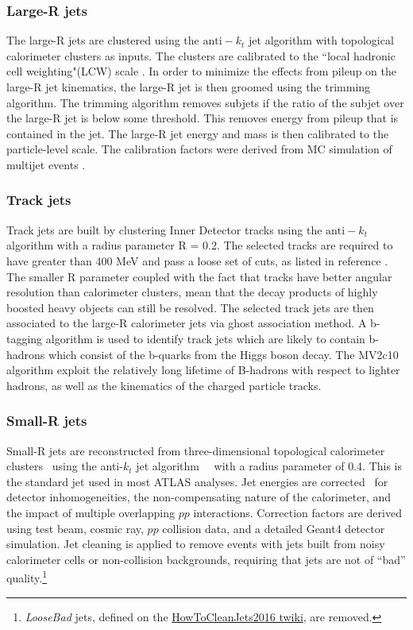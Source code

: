 \subsubsection{Large-R jets}
The large-R jets are clustered using the ${\mathrm{anti-}k_{t}}$ jet algorithm \cite{antikt_algorithm} with topological calorimeter clusters as inputs. The clusters are calibrated to the ``local hadronic cell weighting"(LCW) scale \cite{ATLAS-TopoClustering}.
In order to minimize the effects from pileup on the large-R jet kinematics, the large-R jet is then groomed
using the trimming algorithm. The trimming algorithm removes subjets if the ratio of the subjet \pt over the large-R jet \pt is below some threshold\cite{Krohn:2009th}. This removes energy from pileup that is contained in the jet. The large-R jet energy and mass is then calibrated to the particle-level
scale. The calibration factors were derived from MC simulation of multijet events \cite{ATLAS-CONF-2016-035}.\newline
\subsubsection{Track jets}
Track jets are built by clustering Inner Detector tracks using the ${\mathrm{anti-}k_{t}}$ algorithm with a radius parameter R = 0.2. The selected tracks are required to have \pt greater than 400 MeV and pass a loose set of cuts, as listed in reference \cite{ATL-PHYS-PUB-2015-035}. The smaller R parameter coupled with the fact that tracks have better angular resolution than calorimeter clusters, mean that the decay products of highly boosted heavy objects can still be resolved. The selected track jets are then associated to the large-R calorimeter jets via ghost association \cite{Cacciari:2008gn} method. A b-tagging algorithm is used to identify track jets which are likely to contain b-hadrons which consist of the b-quarks from the Higgs boson decay. The MV2c10 algorithm exploit the relatively long lifetime of B-hadrons with respect to lighter hadrons, as well as the kinematics of the charged particle tracks.
\subsubsection{Small-R jets}
Small-R jets are reconstructed from three-dimensional topological calorimeter 
clusters~\cite{ATLAS-TopoClustering} using the anti-$k_t$ jet 
algorithm~~\cite{antikt_algorithm} with a radius parameter of 0.4. This is the standard jet used in most ATLAS analyses.
Jet energies are corrected~\cite{ATLAS-JES-RUN2} for detector inhomogeneities, the non-compensating nature of the calorimeter, and the impact of multiple overlapping $pp$ interactions. Correction factors are derived using test beam, cosmic ray, $pp$ collision data, and a detailed Geant4 detector simulation.
Jet cleaning is applied to remove events with jets built from noisy
calorimeter cells or non-collision backgrounds, requiring that jets
are not of ``bad'' quality.\footnote{\textit{LooseBad} jets, 
defined on the \href{https://twiki.cern.ch/twiki/bin/view/AtlasProtected/HowToCleanJets2016}{HowToCleanJets2016 twiki}, 
are removed.}

